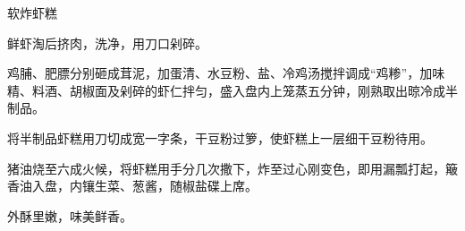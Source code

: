 \begin{recipe}{软炸虾糕}

\ingredients


\preparation

\step 鲜虾淘后挤肉，洗净，用刀口剁碎。

\step 鸡脯、肥膘分别砸成茸泥，加蛋清、水豆粉、盐、冷鸡汤搅拌调成“鸡糁”，加味
精、料酒、胡椒面及剁碎的虾仁拌匀，盛入盘内上笼蒸五分钟，刚熟取出晾冷成半制品。

\step 将半制品虾糕用刀切成宽一字条，干豆粉过箩，使虾糕上一层细干豆粉待用。

\step 猪油烧至六成火候，将虾糕用手分几次撒下，炸至过心刚变色，即用漏瓢打起，簸
香油入盘，内镶生菜、葱酱，随椒盐碟上席。

\features

外酥里嫩，味美鲜香。

\end{recipe}

